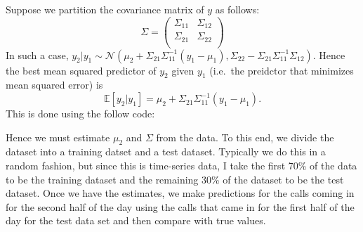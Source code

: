 \documentclass[]{article}
\newenvironment{Shaded}{\begin{snugshade}}{\end{snugshade}}
\newcommand{\KeywordTok}[1]{\textcolor[rgb]{0.13,0.29,0.53}{\textbf{#1}}}
\newcommand{\DecValTok}[1]{\textcolor[rgb]{0.00,0.00,0.81}{#1}}
\newcommand{\StringTok}[1]{\textcolor[rgb]{0.31,0.60,0.02}{#1}}
\newcommand{\CommentTok}[1]{\textcolor[rgb]{0.56,0.35,0.01}{\textit{#1}}}
\newcommand{\ControlFlowTok}[1]{\textcolor[rgb]{0.13,0.29,0.53}{\textbf{#1}}}
\newcommand{\OperatorTok}[1]{\textcolor[rgb]{0.81,0.36,0.00}{\textbf{#1}}}
\newcommand{\NormalTok}[1]{#1}
\begin{document}
Suppose we partition the covariance matrix of \(y\) as follows: \[
\Sigma = 
\begin{pmatrix}
\Sigma_{11} & \Sigma_{12} \\
\Sigma_{21} & \Sigma_{22} \\
\end{pmatrix}
\] In such a case,
\(y_2|y_1 \sim \mathcal{N}(\mu_2 + \Sigma_{21} \Sigma_{11}^{-1} (y_1 - \mu_1), \Sigma_{22} - \Sigma_{21} \Sigma_{11}^{-1} \Sigma_{12})\).
Hence the best mean squared predictor of \(y_2\) given \(y_1\) (i.e.~the
preidctor that minimizes mean squared error) is
\[\mathbb{E}[y_2|y_1] = \mu_2 + \Sigma_{21} \Sigma_{11}^{-1} (y_1 - \mu_1).\]
This is done using the follow code:

\begin{Shaded}
\end{Shaded}

Hence we must estimate \(\mu_2\) and \(\Sigma\) from the data. To this
end, we divide the dataset into a training datset and a test dataset.
Typically we do this in a random fashion, but since this is time-series
data, I take the first 70\% of the data to be the training dataset and
the remaining 30\% of the dataset to be the test dataset. Once we have
the estimates, we make predictions for the calls coming in for the
second half of the day using the calls that came in for the first half
of the day for the test data set and then compare with true values.
\end{document}
